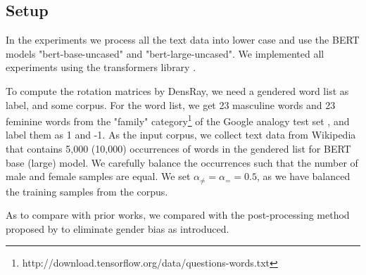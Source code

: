 \subsection{Setup}
In the experiments we process all the text data into lower case and use the BERT models "bert-base-uncased" and "bert-large-uncased". We implemented all experiments using the transformers library \citep{wolf2019huggingfaces}.

To compute the rotation matrices by DensRay, we need a gendered word list as label, and some corpus. For the word list, we get 23 masculine words and 23 feminine words from the "family" category\footnote{http://download.tensorflow.org/data/questions-words.txt} of the Google analogy test set \citep{mikolov2013efficient}, and label them as 1 and -1. As the input corpus, we collect text data from Wikipedia that contains 5,000 (10,000) occurrences of words in the gendered list for BERT base (large) model. We carefully balance the occurrences such that the number of male and female samples are equal. We set  $\alpha_{\neq}=\alpha_{=}=0.5$, as we have balanced the training samples from the corpus.

As to compare with prior works, we compared with the post-processing method proposed by \citet{mu2018all} to eliminate gender bias as \citet{karve2019conceptor} introduced. 

